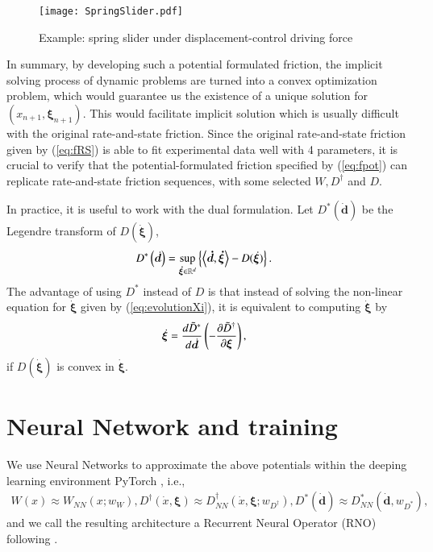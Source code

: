 \begin{figure}
    \centering
    \texttt{[image: SpringSlider.pdf]}
    \caption{Example: spring slider under displacement-control driving force}
    \label{fig:springslider}
\end{figure}

In summary, 
by developing such a potential formulated friction, 
the implicit solving process of dynamic problems are turned into a convex optimization problem, 
which would guarantee us the existence of a unique solution for $(x_{n+1}, \bm{\xi}_{n+1})$. 
This would facilitate implicit solution which is usually difficult with the original rate-and-state friction. 
Since the original rate-and-state friction given by (\ref{eq:fRS}) is able to fit experimental data well with 4 parameters, 
it is crucial to verify that the potential-formulated friction specified by (\ref{eq:fpot}) can replicate rate-and-state friction sequences, 
with some selected $W, D^\dagger$ and $D$. 

In practice, 
it is useful to work with the dual formulation. 
Let $D^*(\bm{\dot{d}})$ be the Legendre transform of $D(\bm{\dot{\xi}})$, 
\begin{align}
    D^*\left(\dot{\bm{d}}\right) &= \sup_{\bm{\dot{\xi}} \in \mathbb{R}^d} \left\{\left\langle \bm{\dot{d}}, \bm{\dot{\xi}} \right\rangle -D(\dot{\bm{\xi}})\right\}. \label{eq:LegendreDstar}
\end{align} 
The advantage of using $D^*$ instead of $D$ is that instead of solving the non-linear equation for $\dot{\bm{\xi}}$ given by (\ref{eq:evolutionXi}), 
it is equivalent to computing $\dot{\bm{\xi}}$ by 
\begin{align}
    \dot{\bm{\xi}} &= \frac{d \Tilde{D}^*}{d \dot{\bm{d}}}\left(-\frac{\partial \Tilde{D}^\dagger}{\partial \bm{\xi}}\right) \label{eq:ComputeXiDot}, 
\end{align}
if $D\left(\bm{\dot{\xi}}\right)$ is convex in $\bm{\dot{\xi}}$. 


\section{Neural Network and training}
\label{sec:NN}
We use Neural Networks to approximate the above potentials within the deeping learning environment PyTorch \citep{paszke2019pytorch}, i.e., 
\begin{align}
    W(x) \approx W_{NN}(x; w_W), 
    D^\dagger(\dot{x}, \bm{\xi}) \approx D^\dagger_{NN}(\dot{x}, \bm{\xi}; w_{D^\dagger}), 
    D^*\left(\dot{\bm{d}}\right) \approx D^*_{NN}\left(\dot{\bm{d}}, w_{D^*}\right)\label{eq:NNpotentials},  
\end{align}
and we call the resulting architecture a Recurrent Neural Operator (RNO) following \citep{BurigedeEric2023, BurigedeMarkovian2023}. 


